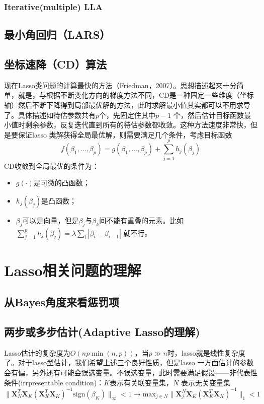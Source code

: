 ﻿\documentclass[hyperref,12pt]{ctexart}
\begin{document}
\subsubsection{Iterative(multiple) LLA}

\subsection{最小角回归（LARS）}

\subsection{坐标速降（CD）算法}
现在Lasso类问题的计算最快的方法（Friedman，2007）。思想描述起来十分简单，就是，与根据不断变化方向的梯度方法不同，CD是一种固定一些维度（坐标轴）然后不断下降得到局部最优解的方法，此时求解最小值其实都可以不用求导了。具体描述如待估参数共有$p$个，先固定住其中$p - 1$ 个，然后估计目标函数最小值时剩余参数，反复迭代直到所有的待估参数都收敛。这种方法速度非常快，但是要保证lasso 类解获得全局最优解，则需要满足几个条件，考虑目标函数
\[
f(\beta_1, \ldots, \beta_p) = g(\beta_1, \ldots, \beta_p) + \sum_{j = 1}^p h_j(\beta_j)
\]
CD收敛到全局最优的条件为：
\begin{itemize}
\item $g(\cdot)$是可微的凸函数；
\item $h_j(\beta_j)$是凸函数；
\item $\beta_j$可以是向量，但是$\beta_j$与$\beta_k$间不能有重叠的元素。比如$\sum_{j = 1}^p h_j(\beta_j) = \lambda \sum_i|\beta_i - \beta_{i - 1}|$ 就不行。
\end{itemize}

\section{Lasso相关问题的理解}
\subsection{从Bayes角度来看惩罚项}


\subsection{两步或多步估计(Adaptive Lasso的理解)}
Lasso估计的复杂度为$O(np\min(n, p))$，当$p \gg n$时，lasso就是线性复杂度了。对于lasso型估计，我们希望上述三个良好性质，但是lasso 一方面估计的参数会有偏，另外还有可能会误选变量。不误选变量，此时需要满足假设——非代表性条件(irrpresentable condition)：$K$表示有关联变量集，$N$ 表示无关变量集
\[
\|\mathbf{X}^T_N \mathbf{X}_K(\mathbf{X}_K^T \mathbf{X}_K)^{-1} \text{sign}(\beta_K)\|_{\infty} <  1 \rightarrow
\text{max}_{j \in N}\|\mathbf{X}_j^N \mathbf{X}_K(\mathbf{X}_K^T\mathbf{X}_K)^{-1}\|_1 < 1
\]
\end{document}
